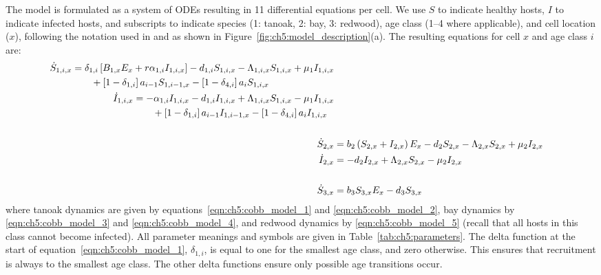 The model is formulated as a system of ODEs resulting in 11 differential equations per cell. We use $S$ to indicate healthy hosts, $I$ to indicate infected hosts, and subscripts to indicate species (1: tanoak, 2: bay, 3: redwood), age class (1--4 where applicable), and cell location ($x$), following the notation used in \citet{cobb_ecosystem_2012} and as shown in Figure~\ref{fig:ch5:model_description}(a). The resulting equations for cell $x$ and age class $i$ are:
\begin{subequations}\label{eqn:ch5:cobb_model}
    \begin{align}
        \begin{split}
            \dot{S}_{1,i,x} &= \delta_{1,i}\left[B_{1,x}E_x+r\alpha_{1,i}I_{1,i,x}\right] - d_{1,i}S_{1,i,x} - \Lambda_{1,i,x}S_{1,i,x} + \mu_1I_{1,i,x} \\
            &{}\quad\quad + \left[1-\delta_{1,i}\right]a_{i-1}S_{1,i-1,x} - \left[1-\delta_{4,i}\right]a_iS_{1,i,x} \label{eqn:ch5:cobb_model_1}
        \end{split}\\
        \begin{split}
            \dot{I}_{1,i,x} &= -\alpha_{1,i}I_{1,i,x} - d_{1,i}I_{1,i,x} + \Lambda_{1,i,x}S_{1,i,x} - \mu_1I_{1,i,x}\\
            &{}\quad\quad + \left[1-\delta_{1,i}\right]a_{i-1}I_{1,i-1,x} - \left[1-\delta_{4,i}\right]a_iI_{1,i,x} \label{eqn:ch5:cobb_model_2}
        \end{split}\\\notag \\
        \dot{S}_{2,x} &= b_2\left(S_{2,x}+I_{2,x}\right)E_x - d_2S_{2,x} - \Lambda_{2,x}S_{2,x} + \mu_2I_{2,x} \label{eqn:ch5:cobb_model_3} \\
        \dot{I}_{2,x} &= - d_2I_{2,x} + \Lambda_{2,x}S_{2,x} - \mu_2I_{2,x}\label{eqn:ch5:cobb_model_4} \\\notag\\
        \dot{S}_{3,x} &= b_3S_{3,x}E_x - d_3S_{3,x} \label{eqn:ch5:cobb_model_5}
    \end{align}
\end{subequations}
where tanoak dynamics are given by equations~\ref{eqn:ch5:cobb_model_1} and \ref{eqn:ch5:cobb_model_2}, bay dynamics by \ref{eqn:ch5:cobb_model_3} and \ref{eqn:ch5:cobb_model_4}, and redwood dynamics by \ref{eqn:ch5:cobb_model_5} (recall that all hosts in this class cannot become infected). All parameter meanings and symbols are given in Table~\ref{tab:ch5:parameters}. The delta function at the start of equation~\ref{eqn:ch5:cobb_model_1}, $\delta_{1,i}$, is equal to one for the smallest age class, and zero otherwise. This ensures that recruitment is always to the smallest age class. The other delta functions ensure only possible age transitions occur.

